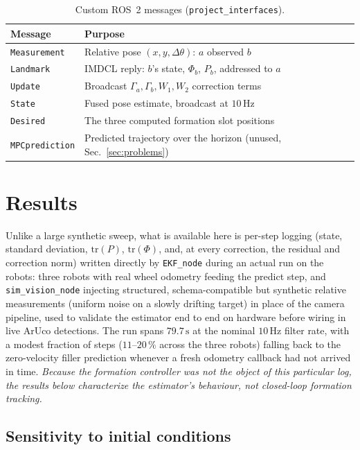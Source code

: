 \documentclass[10pt,conference]{IEEEtran}
\begin{document}
\begin{table}[t]
\centering
\caption{Custom ROS~2 messages (\texttt{project\_interfaces}).}
\label{tab:msgs}
\footnotesize
\begin{tabular}{@{}ll@{}}
\toprule
Message & Purpose \\
\midrule
\texttt{Measurement} & Relative pose $(x,y,\Delta\theta)$: $a$ observed $b$ \\
\texttt{Landmark} & IMDCL reply: $b$'s state, $\Phi_b$, $P_b$, addressed to $a$ \\
\texttt{Update} & Broadcast $\Gamma_a,\Gamma_b,W_1,W_2$ correction terms \\
\texttt{State} & Fused pose estimate, broadcast at $10\,\mathrm{Hz}$ \\
\texttt{Desired} & The three computed formation slot positions \\
\texttt{MPCprediction} & Predicted trajectory over the horizon (unused, Sec.~\ref{sec:problems}) \\
\bottomrule
\end{tabular}
\end{table}

\section{Results}
\label{sec:results}

Unlike a large synthetic sweep, what is available here is per-step logging (state, standard
deviation, $\mathrm{tr}(P)$, $\mathrm{tr}(\Phi)$, and, at every correction, the residual and
correction norm) written directly by \texttt{EKF\_node} during an actual run on the robots: three
robots with real wheel odometry feeding the predict step, and \texttt{sim\_vision\_node} injecting
structured, schema-compatible but synthetic relative measurements (uniform noise on a slowly
drifting target) in place of the camera pipeline, used to validate the estimator end to end on
hardware before wiring in live ArUco detections. The run spans $79.7\,\mathrm{s}$ at the nominal
$10\,\mathrm{Hz}$ filter rate, with a modest fraction of steps ($11$--$20\,\%$ across the three
robots) falling back to the zero-velocity filler prediction whenever a fresh odometry callback had
not arrived in time. \emph{Because the formation controller was not the object of this particular
log, the results below characterize the estimator's behaviour, not closed-loop formation
tracking.}

\subsection{Sensitivity to initial conditions}
\end{document}
